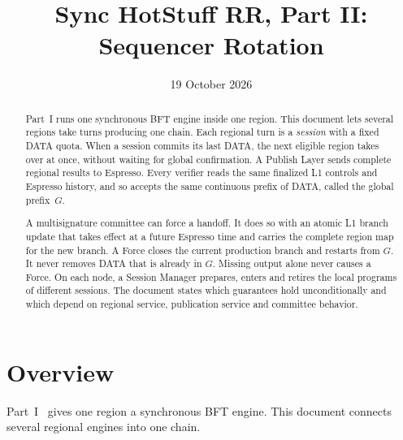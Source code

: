 \documentclass[11pt,a4paper]{article}
\title{Sync HotStuff RR, Part II: Sequencer Rotation}
\author{}\date{19 October 2026}
\begin{document}
\maketitle
\begin{abstract}
Part~I runs one synchronous BFT engine inside one region. This document
lets several regions take turns producing one chain. Each regional turn
is a \emph{session} with a fixed DATA quota. When a session commits its
last DATA, the next eligible region takes over at once, without waiting
for global confirmation. A Publish Layer sends complete regional results
to Espresso. Every verifier reads the same finalized L1 controls and
Espresso history, and so accepts the same continuous prefix of DATA,
called the global prefix~$G$.

A multisignature committee can force a handoff. It does so with an
atomic L1 branch update that takes effect at a future Espresso time and
carries the complete region map for the new branch.
A Force closes the current production branch and restarts from $G$.
It never removes DATA that is already in $G$. Missing output alone never
causes a Force. On each node, a Session Manager prepares, enters and
retires the local programs of different sessions. The document states
which guarantees hold unconditionally and which depend on regional
service, publication service and committee behavior.
\end{abstract}

\section{Overview}
\label{sec:overview}
Part~I~\cite{part1} gives one region a synchronous BFT engine.
This document connects several regional engines into one chain.
\end{document}
